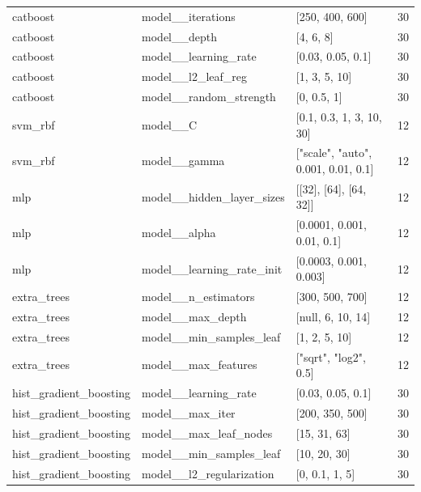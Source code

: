 \begin{tabular}{lllr}
catboost & model\_\_iterations & [250, 400, 600] & 30 \\
catboost & model\_\_depth & [4, 6, 8] & 30 \\
catboost & model\_\_learning\_rate & [0.03, 0.05, 0.1] & 30 \\
catboost & model\_\_l2\_leaf\_reg & [1, 3, 5, 10] & 30 \\
catboost & model\_\_random\_strength & [0, 0.5, 1] & 30 \\
svm\_rbf & model\_\_C & [0.1, 0.3, 1, 3, 10, 30] & 12 \\
svm\_rbf & model\_\_gamma & ["scale", "auto", 0.001, 0.01, 0.1] & 12 \\
mlp & model\_\_hidden\_layer\_sizes & [[32], [64], [64, 32]] & 12 \\
mlp & model\_\_alpha & [0.0001, 0.001, 0.01, 0.1] & 12 \\
mlp & model\_\_learning\_rate\_init & [0.0003, 0.001, 0.003] & 12 \\
extra\_trees & model\_\_n\_estimators & [300, 500, 700] & 12 \\
extra\_trees & model\_\_max\_depth & [null, 6, 10, 14] & 12 \\
extra\_trees & model\_\_min\_samples\_leaf & [1, 2, 5, 10] & 12 \\
extra\_trees & model\_\_max\_features & ["sqrt", "log2", 0.5] & 12 \\
hist\_gradient\_boosting & model\_\_learning\_rate & [0.03, 0.05, 0.1] & 30 \\
hist\_gradient\_boosting & model\_\_max\_iter & [200, 350, 500] & 30 \\
hist\_gradient\_boosting & model\_\_max\_leaf\_nodes & [15, 31, 63] & 30 \\
hist\_gradient\_boosting & model\_\_min\_samples\_leaf & [10, 20, 30] & 30 \\
hist\_gradient\_boosting & model\_\_l2\_regularization & [0, 0.1, 1, 5] & 30 \\
\bottomrule
\end{tabular}
